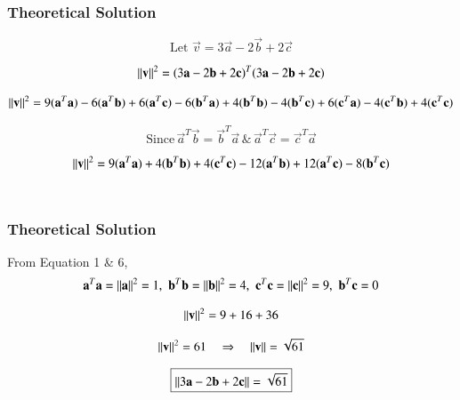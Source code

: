 \documentclass{beamer}
\begin{document}
\begin{frame}[fragile]
    \frametitle{Theoretical Solution}
\begin{equation}
\text{Let} \, \,\vec{v} = 3\vec{a} - 2\vec{b} + 2\vec{c}
\end{equation}


\begin{equation}
\left\lVert\mathbf{v}\right\rVert^2 = (3\mathbf{a} - 2\mathbf{b} + 2\mathbf{c})^T(3\mathbf{a} - 2\mathbf{b} + 2\mathbf{c})
\end{equation}

\begin{equation}
\left\lVert\mathbf{v}\right\rVert^2 = 9(\mathbf{a}^T\mathbf{a}) -6(\mathbf{a}^T\mathbf{b}) +6(\mathbf{a}^T\mathbf{c}) - 6(\mathbf{b}^T\mathbf{a}) + 4(\mathbf{b}^T\mathbf{b}) -4(\mathbf{b}^T\mathbf{c})+ 6(\mathbf{c}^T\mathbf{a}) - 4(\mathbf{c}^T\mathbf{b}) + 4(\mathbf{c}^T\mathbf{c})\\
\end{equation}


\begin{equation}
    \text{Since} \,  \vec{a}^T\vec{b} = \vec{b}^T\vec{a} \, \text{\&}
\, \vec{a}^T\vec{c} = \vec{c}^T\vec{a}
\end{equation}


\begin{equation}
\left\lVert\mathbf{v}\right\rVert^2 = 9(\mathbf{a}^T\mathbf{a}) + 4(\mathbf{b}^T\mathbf{b}) + 4(\mathbf{c}^T\mathbf{c}) - 12(\mathbf{a}^T\mathbf{b}) + 12(\mathbf{a}^T\mathbf{c}) - 8(\mathbf{b}^T\mathbf{c})
\end{equation}\\
\end{frame}

\begin{frame}[fragile]
\frametitle{Theoretical  Solution}
From Equation 1 \& 6,
\begin{equation}
\mathbf{a}^T\mathbf{a} = \left\lVert\mathbf{a}\right\rVert^2 = 1, \,\,
\mathbf{b}^T\mathbf{b} = \left\lVert\mathbf{b}\right\rVert^2 = 4, \,\,
\mathbf{c}^T\mathbf{c} = \left\lVert\mathbf{c}\right\rVert^2 = 9, \,\,
\mathbf{b}^T\mathbf{c} = 0
\end{equation}


\begin{equation}
\left\lVert\mathbf{v}\right\rVert^2 = 9 + 16 + 36
\end{equation}


\begin{align}
    \centering
    \norm{\vec{v}}^2 = 61 
    \quad \Rightarrow \quad
    \norm{\vec{v}} = \sqrt{61}
\end{align}

\begin{align}
\centering
\boxed{\norm{3\vec{a} - 2\vec{b} + 2\vec{c}} = \sqrt{61}}
\end{align}
\end{frame}
\end{document}
